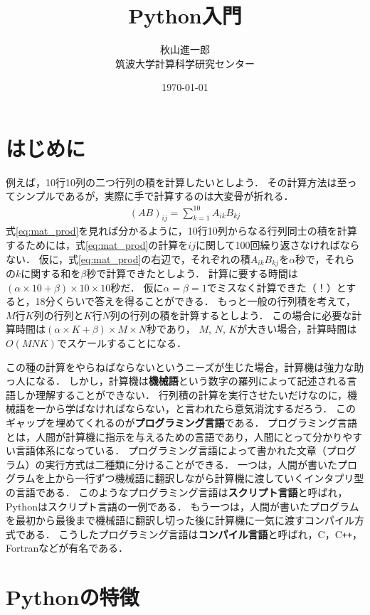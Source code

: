 \documentclass[a4paper,12pt]{jsarticle}
\title{Python入門}
\author{秋山進一郎\\筑波大学計算科学研究センター}
\date{\today}
\begin{document}
\maketitle

\tableofcontents

\section{はじめに}

例えば，10行10列の二つ行列の積を計算したいとしよう．
その計算方法は至ってシンプルであるが，実際に手で計算するのは大変骨が折れる．
\begin{align}
\label{eq:mat_prod}
    (AB)_{ij}
    =
    \sum_{k=1}^{10}A_{ik}B_{kj}
\end{align}
式\eqref{eq:mat_prod}を見れば分かるように，10行10列からなる行列同士の積を計算するためには，式\eqref{eq:mat_prod}の計算を$ij$に関して100回繰り返さなければならない．
仮に，式\eqref{eq:mat_prod}の右辺で，それぞれの積$A_{ik}B_{kj}$を$\alpha$秒で，それらの$k$に関する和を$\beta$秒で計算できたとしよう．
計算に要する時間は$(\alpha\times10+\beta)\times10\times10$秒だ．
仮に$\alpha=\beta=1$でミスなく計算できた（！）とすると，18分くらいで答えを得ることができる．
もっと一般の行列積を考えて，$M$行$K$列の行列と$K$行$N$列の行列の積を計算するとしよう．
この場合に必要な計算時間は$(\alpha\times K+\beta)\times M\times N$秒であり，
$M$, $N$, $K$が大きい場合，計算時間は$O(MNK)$でスケールすることになる．

この種の計算をやらねばならないというニーズが生じた場合，計算機は強力な助っ人になる．
しかし，計算機は{\bf 機械語}という数字の羅列によって記述される言語しか理解することができない．
行列積の計算を実行させたいだけなのに，機械語を一から学ばなければならない，と言われたら意気消沈するだろう．
このギャップを埋めてくれるのが{\bf プログラミング言語}である．
プログラミング言語とは，人間が計算機に指示を与えるための言語であり，人間にとって分かりやすい言語体系になっている．
プログラミング言語によって書かれた文章（プログラム）の実行方式は二種類に分けることができる．
一つは，人間が書いたプログラムを上から一行ずつ機械語に翻訳しながら計算機に渡していくインタプリ型の言語である．
このようなプログラミング言語は{\bf スクリプト言語}と呼ばれ，Pythonはスクリプト言語の一例である．
もう一つは，人間が書いたプログラムを最初から最後まで機械語に翻訳し切った後に計算機に一気に渡すコンパイル方式である．
こうしたプログラミング言語は{\bf コンパイル言語}と呼ばれ，C，C\texttt{++}，Fortranなどが有名である．

\section{Pythonの特徴}
\end{document}
